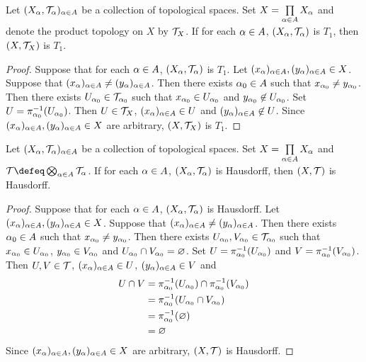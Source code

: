 \documentclass{book}
\begin{document}
	\begin{ex} 
		Let $(X_{\alpha}, \mathcal{T}_{\alpha})_{\alpha \in A}$ be a collection of topological spaces. Set $X = \prod\limits_{\alpha \in A} X_{\alpha}$ and denote the product topology on $X$ by $\mathcal{T}_X$. If for each $\alpha \in A$, $(X_{\alpha}, \mathcal{T}_{\alpha})$ is $T_1$, then $(X, \mathcal{T}_X)$ is $T_1$.
	\end{ex}
	
	\begin{proof}
		Suppose that for each $\alpha \in A$, $(X_{\alpha}, \mathcal{T}_{\alpha})$ is $T_1$. Let $(x_{\alpha})_{\alpha \in A}, (y_{\alpha})_{\alpha \in A} \in X$. Suppose that $(x_{\alpha})_{\alpha \in A} \neq (y_{\alpha})_{\alpha \in A}$. Then there exists $\alpha_0 \in A$ such that $x_{\alpha_0} \neq y_{\alpha_0}$. Then there exists $U_{\alpha_0} \in \mathcal{T}_{\alpha_0}$ such that $x_{\alpha_0} \in U_{\alpha_0}$ and $y_{\alpha_0} \not \in U_{\alpha_0}$. Set $U = \pi_{\alpha_0}^{-1}(U_{\alpha_0})$. Then $U \in \mathcal{T}_X$, $(x_{\alpha})_{\alpha \in A} \in U$ and $(y_{\alpha})_{\alpha \in A} \not \in U$. Since $(x_{\alpha})_{\alpha \in A}, (y_{\alpha})_{\alpha \in A} \in X$ are arbitrary, $(X, \mathcal{T}_X)$ is $T_1$.
	\end{proof}
	
	\begin{ex} 
		Let $(X_{\alpha}, \mathcal{T}_{\alpha})_{\alpha \in A}$ be a collection of topological spaces. Set $X = \prod\limits_{\alpha \in A} X_{\alpha}$ and $\MT \defeq \bigotimes_{\al \in A} \MT_{\al}$. If for each $\alpha \in A$, $(X_{\alpha}, \mathcal{T}_{\alpha})$ is Hausdorff, then $(X, \mathcal{T})$ is Hausdorff.
	\end{ex}
	
	\begin{proof}
		Suppose that for each $\alpha \in A$, $(X_{\alpha}, \mathcal{T}_{\alpha})$ is Hausdorff. Let $(x_{\alpha})_{\alpha \in A}, (y_{\alpha})_{\alpha \in A} \in X$. Suppose that $(x_{\alpha})_{\alpha \in A} \neq (y_{\alpha})_{\alpha \in A}$. Then there exists $\alpha_0 \in A$ such that $x_{\alpha_0} \neq y_{\alpha_0}$. Then there exists $U_{\alpha_0}, V_{\alpha_0} \in \mathcal{T}_{\alpha_0}$ such that $x_{\alpha_0} \in U_{\alpha_0}$, $y_{\alpha_0} \in V_{\alpha_0}$ and $U_{\alpha_0} \cap V_{\alpha_0} = \varnothing$. Set $U = \pi_{\alpha_0}^{-1}(U_{\alpha_0})$ and $V = \pi_{\alpha_0}^{-1}(V_{\alpha_0})$. Then $U, V \in \mathcal{T}$, $(x_{\alpha})_{\alpha \in A} \in U$, $(y_{\alpha})_{\alpha \in A} \in V$ and 
		\begin{align*}
			U \cap V
			& = \pi_{\alpha_0}^{-1}(U_{\alpha_0}) \cap \pi_{\alpha_0}^{-1}(V_{\alpha_0}) \\
			& = \pi_{\alpha_0}^{-1}(U_{\alpha_0} \cap V_{\alpha_0}) \\
			& = \pi_{\alpha_0}^{-1}(\varnothing) \\
			& = \varnothing
		\end{align*}
		Since $(x_{\alpha})_{\alpha \in A}, (y_{\alpha})_{\alpha \in A} \in X$ are arbitrary, $(X, \mathcal{T})$ is Hausdorff.
	\end{proof}
	
\end{document}
